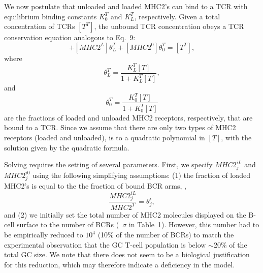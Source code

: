 We now postulate that unloaded and loaded MHC2's can bind to a TCR with equilibrium binding constants $K^T_0$ and $K^T_L$, respectively.
Given a total concentration of TCRs $[T^T]$, the unbound TCR concentration obeys a TCR conservation equation
analogous to Eq.~9\cite{kepler93}:
\begin{equation}
 [T] + [MHC2^L] \theta^T_L + [MHC2^0] \theta^T_0 = [T^T],
\label{eq:tcons}
\end{equation}
where
\begin{equation}
 \theta^T_L = \frac{ K^T_L [T] }{ 1 + K^T_L [T] },
\end{equation}
and
\begin{equation}
 \theta^T_0 = \frac{ K^T_0 [T] }{ 1 + K^T_0 [T] }
\end{equation}
are the fractions of loaded and unloaded MHC2 receptors, respectively, that are bound to a TCR.
Since we assume that there are only two types of MHC2 receptors (loaded and unloaded),
 is  to a quadratic polynomial in $[T]$, with the
solution\cite{mayer19}
given by the quadratic formula.

Solving  requires the setting of
several parameters. First, we specify $MHC2^{iL}_j$ and $MHC2^{i0}_j$ using the following simplifying
assumptions: (1) the fraction of loaded MHC2's is equal to the the fraction of bound BCR arms, \ie,
\begin{equation}
 \frac{MHC2^{iL}_j}{MHC2^T}=\theta^i_j,
\end{equation}
and (2) we initially set the total number of MHC2 molecules displayed on
the B-cell surface to the number of BCRs (\ie~$\sigma$ in Table~1).
However, this number had to be empirically reduced to $10^4$ (10\% of the
number of BCRs) to match the experimental
observation that the GC T-cell population is below $\sim$20\% of the
total GC size\cite{allen07}. We note that there does not seem to be a biological justification for this reduction,
which may therefore indicate a deficiency in the model.

